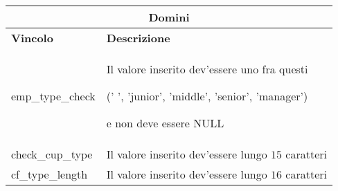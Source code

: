 \begin{tabular}{@{}| p{} | p{} |@{}} %
	\hline
	\multicolumn{2}{|c|}{\textbf{Domini}}                                 \\
	\hline
	\textbf{Vincolo} & \textbf{Descrizione}                               \\
	\hline
	emp\_type\_check & Il valore inserito dev'essere uno fra questi

	(' ', 'junior', 'middle', 'senior', 'manager')

	e non deve essere NULL                                                \\
	\hline
	check\_cup\_type & Il valore inserito dev'essere lungo $15$ caratteri \\
	\hline
	cf\_type\_length & Il valore inserito dev'essere lungo $16$ caratteri \\
	\hline
\end{tabular}

\newpage
